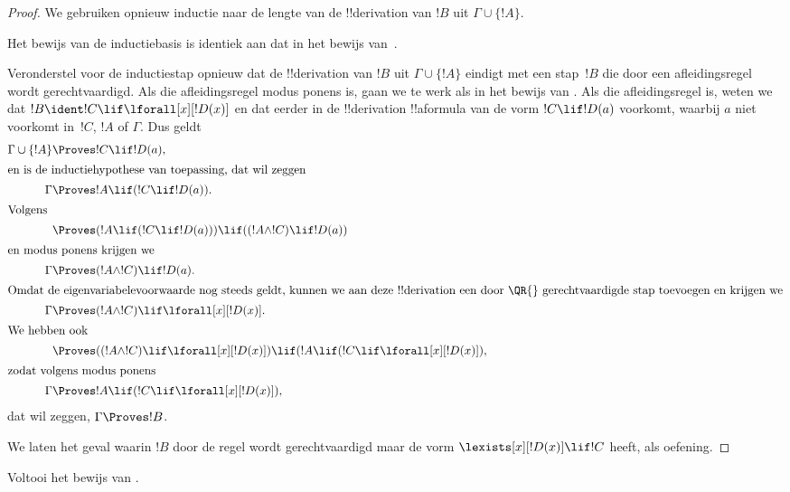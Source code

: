 \documentclass[openany]{memoir}
\begin{document}
\begin{proof}
We gebruiken opnieuw inductie naar de lengte van de !!{derivation}
van $!B$ uit $\Gamma \cup \{!A\}$.

Het bewijs van de inductiebasis is identiek aan dat in het bewijs
van~.

Veronderstel voor de inductiestap opnieuw dat de !!{derivation} van
$!B$ uit $\Gamma \cup \{!A\}$ eindigt met een stap~$!B$ die door een
afleidingsregel wordt gerechtvaardigd. Als die afleidingsregel modus
ponens is, gaan we te werk als in het bewijs van
. Als die afleidingsregel \QR{} is, weten
we dat $!B \ident !C \lif \lforall[x][!D(x)]$ en dat eerder in de
!!{derivation} !!a{formula} van de vorm $!C \lif !D(a)$ voorkomt,
waarbij $a$ niet voorkomt in~$!C$, $!A$ of $\Gamma$. Dus geldt
\begin{align*}
  \Gamma \cup \{!A\} & \Proves !C \lif !D(a),\\
  \intertext{en is de inductiehypothese van toepassing, dat wil zeggen}
    \Gamma & \Proves !A \lif (!C \lif !D(a)).\\
  \intertext{Volgens}
  & \Proves (!A \lif (!C \lif !D(a))) \lif ((!A \land !C) \lif !D(a))\\
  \intertext{en modus ponens krijgen we}
  \Gamma & \Proves (!A \land !C) \lif !D(a).\\
  \intertext{Omdat de eigenvariabelevoorwaarde nog steeds geldt, kunnen we aan deze !!{derivation} een door \QR{} gerechtvaardigde stap toevoegen en krijgen we}
    \Gamma & \Proves (!A \land !C) \lif \lforall[x][!D(x)].\\
    \intertext{We hebben ook}
    & \Proves ((!A \land !C) \lif \lforall[x][!D(x)]) \lif (!A \lif (!C \lif \lforall[x][!D(x)]),\\
    \intertext{zodat volgens modus ponens}
    \Gamma & \Proves !A \lif (!C \lif \lforall[x][!D(x)]),
\end{align*}
dat wil zeggen, $\Gamma \Proves !B$.

We laten het geval waarin $!B$ door de regel \QR{} wordt
gerechtvaardigd maar de vorm $\lexists[x][!D(x)] \lif !C$ heeft, als
oefening.
\end{proof}

\begin{prob}
  Voltooi het bewijs van .
\end{prob}
\endgroup
\end{document}
